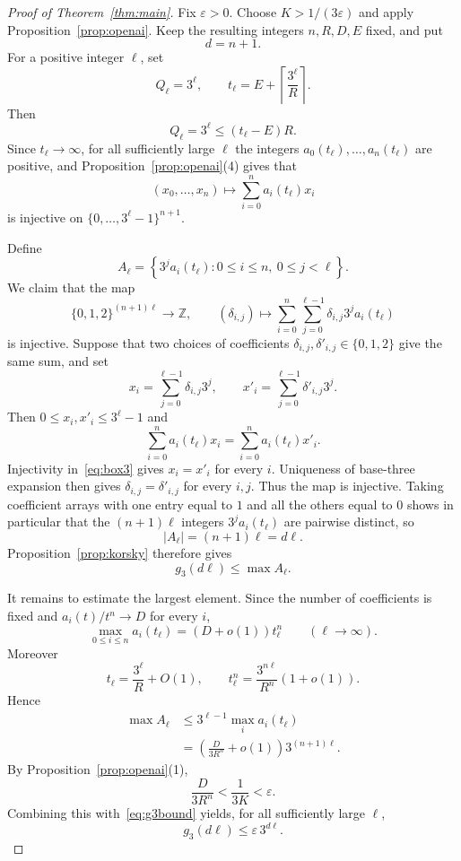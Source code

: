 \documentclass[10pt,a4paper]{amsart}
\theoremstyle{remark}
\newcommand{\Z}{\mathbb Z}
\newcommand{\ee}{\varepsilon}
\begin{document}
\begin{proof}[Proof of Theorem~\ref{thm:main}]
Fix $\ee>0$. Choose $K>1/(3\ee)$ and apply Proposition~\ref{prop:openai}. Keep the resulting integers $n,R,D,E$ fixed, and put
\[
 d=n+1.
\]
For a positive integer $\ell$, set
\[
 Q_\ell=3^\ell,
 \qquad
 t_\ell=E+\left\lceil\frac{3^\ell}{R}\right\rceil.
\]
Then
\[
 Q_\ell=3^\ell\le(t_\ell-E)R.
\]
Since $t_\ell\to\infty$, for all sufficiently large $\ell$ the integers
$a_0(t_\ell),\ldots,a_n(t_\ell)$ are positive, and Proposition~\ref{prop:openai}(4) gives that
\begin{equation}\label{eq:box3}
 (x_0,\ldots,x_n)\longmapsto
 \sum_{i=0}^n a_i(t_\ell)x_i
\end{equation}
is injective on $\{0,\ldots,3^\ell-1\}^{n+1}$.

Define
\[
 A_\ell=
 \left\{3^j a_i(t_\ell):0\le i\le n,\ 0\le j<\ell\right\}.
\]
We claim that the map
\[
 \{0,1,2\}^{(n+1)\ell}\longrightarrow\Z,
 \qquad
 (\delta_{i,j})\longmapsto
 \sum_{i=0}^n\sum_{j=0}^{\ell-1}\delta_{i,j}3^j a_i(t_\ell)
\]
is injective. Suppose that two choices of coefficients $\delta_{i,j},\delta'_{i,j}\in\{0,1,2\}$ give the same sum, and set
\[
 x_i=\sum_{j=0}^{\ell-1}\delta_{i,j}3^j,
 \qquad
 x'_i=\sum_{j=0}^{\ell-1}\delta'_{i,j}3^j.
\]
Then $0\le x_i,x'_i\le3^\ell-1$ and
\[
 \sum_{i=0}^n a_i(t_\ell)x_i
 =\sum_{i=0}^n a_i(t_\ell)x'_i.
\]
Injectivity in~\eqref{eq:box3} gives $x_i=x'_i$ for every $i$. Uniqueness of base-three expansion then gives $\delta_{i,j}=\delta'_{i,j}$ for every $i,j$. Thus the map is injective. Taking coefficient arrays with one entry equal to $1$ and all the others equal to $0$ shows in particular that the $(n+1)\ell$ integers $3^j a_i(t_\ell)$ are pairwise distinct, so
\[
 |A_\ell|=(n+1)\ell=d\ell.
\]
Proposition~\ref{prop:korsky} therefore gives
\begin{equation}\label{eq:g3bound}
 g_3(d\ell)\le \max A_\ell.
\end{equation}

It remains to estimate the largest element. Since the number of coefficients is fixed and
$a_i(t)/t^n\to D$ for every $i$,
\[
 \max_{0\le i\le n}a_i(t_\ell)=(D+o(1))t_\ell^n
 \qquad(\ell\to\infty).
\]
Moreover
\[
 t_\ell=\frac{3^\ell}{R}+O(1),
 \qquad
 t_\ell^n=\frac{3^{n\ell}}{R^n}(1+o(1)).
\]
Hence
\begin{align*}
 \max A_\ell
 &\le 3^{\ell-1}\max_i a_i(t_\ell)\\
 &=\left(\frac{D}{3R^n}+o(1)\right)3^{(n+1)\ell}.
\end{align*}
By Proposition~\ref{prop:openai}(1),
\[
 \frac{D}{3R^n}<\frac1{3K}<\ee.
\]
Combining this with~\eqref{eq:g3bound} yields, for all sufficiently large $\ell$,
\[
 g_3(d\ell)\le\ee\,3^{d\ell}.
\]
\end{proof}
\end{document}
